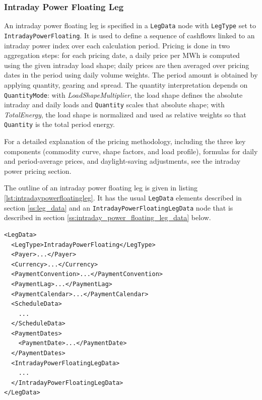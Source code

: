 \subsubsection{Intraday Power Floating Leg}
\label{ss:intradaypowerfloatingleg}

An intraday power floating leg is specified in a \lstinline!LegData! node with \lstinline!LegType! set to \lstinline!IntradayPowerFloating!.
It is used to define a sequence of cashflows linked to an intraday power index over each calculation period.
Pricing is done in two aggregation steps: for each pricing date, a daily price per MWh is computed using the given intraday load shape; daily prices are then averaged over pricing dates in the period using daily volume weights.
The period amount is obtained by applying quantity, gearing and spread. The quantity interpretation depends on \lstinline!QuantityMode!: with \emph{LoadShapeMultiplier}, the load shape defines the absolute intraday and daily loads and
 \lstinline!Quantity! scales that absolute shape; with \emph{TotalEnergy}, the load shape is normalized and used as relative weights so that \lstinline!Quantity! is the total period energy.

For a detailed explanation of the pricing methodology, including the three key components (commodity curve, shape factors, and load profile), formulas for daily and period-average prices, and daylight-saving adjustments, see the intraday power pricing section.

The outline of an intraday power floating leg is given in listing \ref{lst:intradaypowerfloatingleg}. It has the usual \lstinline!LegData! elements described in section \ref{ss:leg_data} and an \lstinline!IntradayPowerFloatingLegData! node that is described in section \ref{ss:intraday_power_floating_leg_data} below.

\begin{listing}[h!]
\begin{verbatim}
<LegData>
  <LegType>IntradayPowerFloating</LegType>
  <Payer>...</Payer>
  <Currency>...</Currency>
  <PaymentConvention>...</PaymentConvention>
  <PaymentLag>...</PaymentLag>
  <PaymentCalendar>...</PaymentCalendar>
  <ScheduleData>
    ...
  </ScheduleData>
  <PaymentDates>
    <PaymentDate>...</PaymentDate>
  </PaymentDates>
  <IntradayPowerFloatingLegData>
    ...
  </IntradayPowerFloatingLegData>
</LegData>
\end{verbatim}
\caption{Intraday power floating leg outline.}
\label{lst:intradaypowerfloatingleg}
\end{listing}


